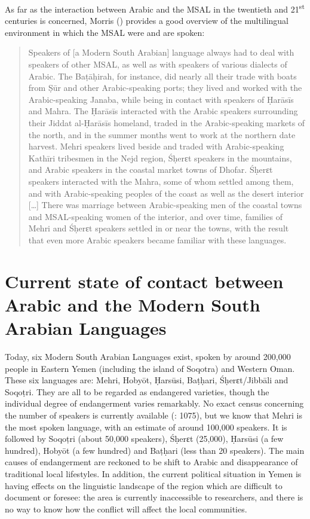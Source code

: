 \documentclass[output=paper]{langsci/langscibook}
\begin{document}
As far as the interaction between Arabic and the MSAL in the twentieth and 21\textsuperscript{st} centuries is concerned, Morris (\citeyear[25]{Morris2017}) provides a good overview of the multilingual environment in which the MSAL were and are spoken: 

\begin{quote}
Speakers of [a Modern South Arabian] language always had to deal with speakers of other MSAL, as well as with speakers of various dialects of Arabic. The Baṭāḥirah, for instance, did nearly all their trade with boats from Ṣūr and other Arabic-speaking ports; they lived and worked with the Arabic-speaking Janaba, while being in contact with speakers of Ḥarāsīs and Mahra. The Ḥarāsīs interacted with the Arabic speakers surrounding their Jiddat al-Ḥarāsīs homeland, traded in the Arabic-speaking markets of the north, and in the summer months went to work at the northern date harvest. Mehri speakers lived beside and traded with Arabic-speaking Kathīri tribesmen in the Nejd region, Śḥerɛt speakers in the mountains, and Arabic speakers in the coastal market towns of Dhofar. Śḥerɛt speakers interacted with the Mahra, some of whom settled among them, and with Arabic-speaking peoples of the coast as well as the desert interior […] There was marriage between Arabic-speaking men of the coastal towns and MSAL-speaking women of the interior, and over time, families of Mehri and Śḥerɛt speakers settled in or near the towns, with the result that even more Arabic speakers became familiar with these languages.
\end{quote}

\section{Current state of contact between Arabic and the Modern South Arabian Languages}\label{sec:2}

Today, six Modern South Arabian Languages exist, spoken by around 200,000 people in Eastern Yemen (including the island of Soqotra) and Western Oman. These six languages are: Mehri, Hobyōt, Ḥarsūsi, Baṭḥari, Śḥerɛt/Jibbāli and Soqoṭri. They are all to be regarded as endangered varieties, though the individual degree of endangerment varies remarkably. No exact census concerning the number of speakers is currently available (\citealt{Simeone-Senelle2011}: 1075), but we know that Mehri is the most spoken language, with an estimate of around 100,000 speakers. It is followed by Soqoṭri (about 50,000 speakers), Śḥerɛt (25,000), Ḥarsūsi (a few hundred), Hobyōt (a few hundred) and Baṭḥari (less than 20 speakers). The main causes of endangerment are reckoned to be shift to Arabic and disappearance of traditional local lifestyles. In addition, the current political situation in Yemen is having effects on the linguistic landscape of the region which are difficult to document or foresee: the area is currently inaccessible to researchers, and there is no way to know how the conflict will affect the local communities.
\end{document}
